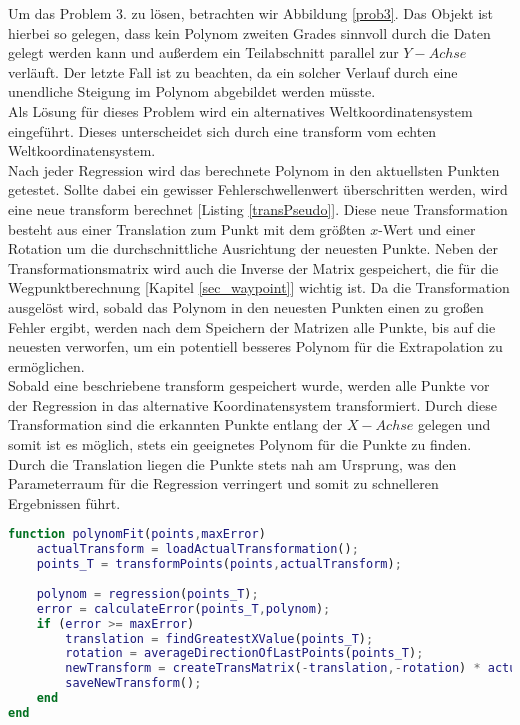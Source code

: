 Um das Problem 3. zu lösen, betrachten wir Abbildung \ref{prob3}. Das Objekt ist hierbei so gelegen, dass kein Polynom zweiten Grades sinnvoll durch die Daten gelegt werden kann und außerdem ein Teilabschnitt parallel zur $Y-Achse$ verläuft. Der letzte Fall ist zu beachten, da ein solcher Verlauf durch eine unendliche Steigung im Polynom abgebildet werden müsste.\\
Als Lösung für dieses Problem wird ein alternatives Weltkoordinatensystem eingeführt. Dieses unterscheidet sich durch eine \gls{transform} vom echten Weltkoordinatensystem.\\
Nach jeder Regression wird das berechnete Polynom in den aktuellsten Punkten getestet. Sollte dabei ein gewisser Fehlerschwellenwert überschritten werden, wird eine neue \gls{transform} berechnet [Listing \ref{transPseudo}]. Diese neue Transformation besteht aus einer Translation zum Punkt mit dem größten $x$-Wert und einer Rotation um die durchschnittliche Ausrichtung der neuesten Punkte. Neben der Transformationsmatrix wird auch die Inverse der Matrix gespeichert, die für die Wegpunktberechnung [Kapitel \ref{sec_waypoint}] wichtig ist. Da die Transformation ausgelöst wird, sobald das Polynom in den neuesten Punkten einen zu großen Fehler ergibt, werden nach dem Speichern der Matrizen alle Punkte, bis auf die neuesten verworfen, um ein potentiell besseres Polynom für die Extrapolation zu ermöglichen.\\
Sobald eine beschriebene \gls{transform} gespeichert wurde, werden alle Punkte vor der Regression in das alternative Koordinatensystem transformiert. Durch diese Transformation sind die erkannten Punkte entlang der $X-Achse$ gelegen und somit ist es möglich, stets ein geeignetes Polynom für die Punkte zu finden. Durch die Translation liegen die Punkte stets nah am Ursprung, was den Parameterraum für die Regression verringert und somit zu schnelleren Ergebnissen führt.\label{alterWorldCoords}
\begin{lstlisting}[language=Matlab,caption=Pseudocode des Schätzverfahrens,label=transPseudo]
function polynomFit(points,maxError)
	actualTransform = loadActualTransformation();
	points_T = transformPoints(points,actualTransform);
	
	polynom = regression(points_T);
	error = calculateError(points_T,polynom);
	if (error >= maxError)
		translation = findGreatestXValue(points_T);
		rotation = averageDirectionOfLastPoints(points_T);
		newTransform = createTransMatrix(-translation,-rotation) * actualTransform;
		saveNewTransform();
	end
end
\end{lstlisting}



